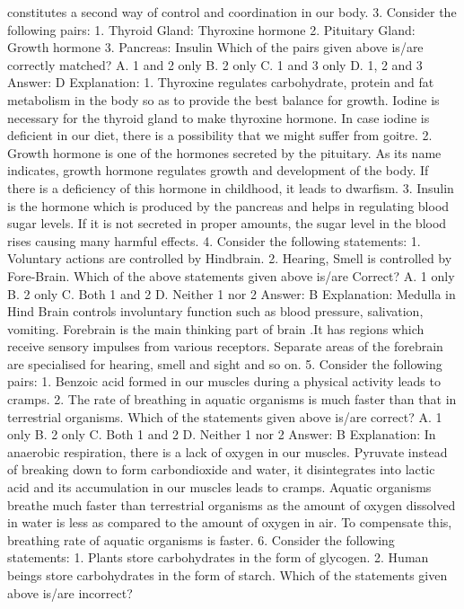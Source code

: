 constitutes a second way of control and coordination in our
body.
3. Consider the following pairs:
1. Thyroid Gland: Thyroxine hormone
2. Pituitary Gland: Growth hormone
3. Pancreas: Insulin
Which of the pairs given above is/are correctly matched?
A. 1 and 2 only
B. 2 only
C. 1 and 3 only
D. 1, 2 and 3
Answer: D
Explanation:
1. Thyroxine regulates carbohydrate, protein and fat metabolism in
the body so as to provide the best balance for growth. Iodine is
necessary for the thyroid gland to make thyroxine hormone. In case
iodine is deficient in our diet, there is a possibility that we might
suffer from goitre.
2. Growth hormone is one of the hormones secreted by the pituitary.
As its name indicates, growth hormone regulates growth and
development of the body. If there is a deficiency of this hormone in
childhood, it leads to dwarfism.
3. Insulin is the hormone which is produced by the pancreas and
helps in regulating blood sugar levels. If it is not secreted in proper
amounts, the sugar level in the blood rises causing many harmful
effects.
4. Consider the following statements:
1. Voluntary actions are controlled by Hindbrain.
2. Hearing, Smell is controlled by Fore-Brain.
Which of the above statements given above is/are Correct?
A. 1 only
B. 2 only
C. Both 1 and 2
D. Neither 1 nor 2
Answer: B
Explanation: Medulla in Hind Brain controls involuntary function such
as blood pressure, salivation, vomiting. Forebrain is the main
thinking part of brain .It has regions which receive sensory impulses
from various receptors. Separate areas of the forebrain are
specialised for hearing, smell and sight and so on.
5. Consider the following pairs:
1. Benzoic acid formed in our muscles during a physical activity leads
to cramps.
2. The rate of breathing in aquatic organisms is much faster than
that in terrestrial organisms.
Which of the statements given above is/are correct?
A. 1 only
B. 2 only
C. Both 1 and 2
D. Neither 1 nor 2
Answer: B
Explanation: In anaerobic respiration, there is a lack of oxygen in
our muscles. Pyruvate instead of breaking down to form carbondioxide and water, it disintegrates into lactic acid and its
accumulation in our muscles leads to cramps.
Aquatic organisms breathe much faster than terrestrial organisms
as the amount of oxygen dissolved in water is less as compared to
the amount of oxygen in air. To compensate this, breathing rate of
aquatic organisms is faster.
6. Consider the following statements:
1. Plants store carbohydrates in the form of glycogen.
2. Human beings store carbohydrates in the form of starch.
Which of the statements given above is/are incorrect?
